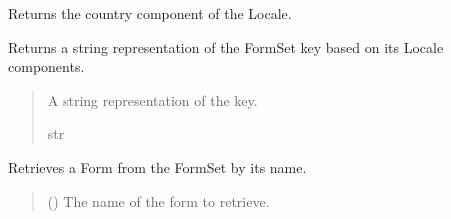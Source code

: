 \documentclass[letterpaper,10pt,english]{sphinxmanual}
\begin{document}
\begin{fulllineitems}
\begin{fulllineitems}
\label{\detokenize{apache_commons_validator_python:id12}}
\pysigstartsignatures
{}
\pysigstopsignatures
\sphinxAtStartPar
Returns the country component of the Locale.

\end{fulllineitems}


\begin{fulllineitems}
\label{\detokenize{apache_commons_validator_python:apache_commons_validator_python.form_set_new.FormSet.display_key}}
\pysigstartsignatures
{}
\pysigstopsignatures
\sphinxAtStartPar
Returns a string representation of the FormSet key based on its Locale
components.
\begin{quote}\begin{description}
\sphinxAtStartPar
A string representation of the key.

\sphinxAtStartPar
str

\end{description}\end{quote}

\end{fulllineitems}


\begin{fulllineitems}
\label{\detokenize{apache_commons_validator_python:apache_commons_validator_python.form_set_new.FormSet.get_form}}
\pysigstartsignatures
{}
\pysigstopsignatures
\sphinxAtStartPar
Retrieves a Form from the FormSet by its name.
\begin{quote}\begin{description}
\sphinxAtStartPar
{} () \textendash{} The name of the form to retrieve.


\end{description}
\end{quote}
\end{fulllineitems}
\end{fulllineitems}
\end{document}
